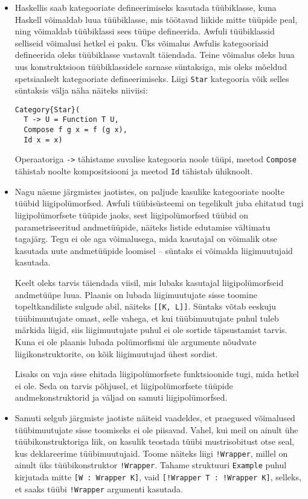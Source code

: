 \documentclass[12pt]{article}
\begin{document}
        \begin{itemize}
          \item
            Haskellis saab kategooriate defineerimiseks kasutada tüübiklasse, kuna Haskell võimaldab luua tüübiklasse, mis töötavad liikide mitte tüüpide peal, ning võimaldab tüübiklassi sees tüüpe defineerida. Awfuli tüübiklassid selliseid võimalusi hetkel ei paku. Üks võimalus Awfulis kategooriaid defineerida oleks tüübiklasse vastavalt täiendada. Teine võimalus oleks luua uus konstruktsioon tüübiklassidele sarnase süntaksiga, mis oleks mõeldud spetsiaalselt kategooriate defineerimiseks. Liigi \verb!Star! kategooria võik selles süntaksis välja näha näiteks niiviisi:

            \begin{verbatim}Category{Star}(
  T -> U = Function T U,
  Compose f g x = f (g x),
  Id x = x)\end{verbatim}

            Operaatoriga \verb!->! tähistame suvalise kategooria noole tüüpi, meetod \verb!Compose! tähistab noolte kompositsiooni ja meetod \verb!Id! tähistab ühiknoolt.
          \item
            Nagu näeme järgmistes jaotistes, on paljude kasulike kategooriate noolte tüübid liigipolümorfsed. Awfuli tüübisüsteemi on tegelikult juba ehitatud tugi liigipolümorfsete tüüpide jaoks, sest liigipolümorfsed tüübid on parametriseeritud andmetüüpide, näiteks listide edutamise vältimatu tagajärg. Tegu ei ole aga võimalusega, mida kasutajal on võimalik otse kasutada uute andmetüüpide loomisel -- süntaks ei võimalda liigimuutujaid kasutada.

            Keelt oleks tarvis täiendada viisil, mis lubaks kasutajal liigipolümorfseid andmetüüpe luua. Plaanis on lubada liigimuutujate sisse toomine topeltkandiliste sulgude abil, näiteks \verb![[K, L]]!. Süntaks võtab eeskuju tüübimuutujate omast, selle vahega, et kui tüübimuutujate puhul tuleb märkida liigid, siis liigimuutujate puhul ei ole sortide täpsustamist tarvis. Kuna ei ole plaanis lubada polümorfismi üle argumente nõudvate liigikonstruktorite, on kõik liigimuutujad ühest sordist.

            Lisaks on vaja sisse ehitada liigipolümorfsete funktsioonide tugi, mida hetkel ei ole. Seda on tarvis põhjusel, et liigipolümorfsete tüüpide andmekonstruktorid ja väljad on samuti liigipolümorfsed.
          \item
            Samuti selgub järgmiste jaotiste näiteid vaadeldes, et praegused võimalused tüübimuutujate sisse toomiseks ei ole piisavad. Vahel, kui meil on ainult ühe tüübikonstruktoriga liik, on kasulik teostada tüübi mustrisobitust otse seal, kus deklareerime tüübimuutujaid. Toome näiteks liigi \verb"!Wrapper", millel on ainult üks tüübikonstruktor \verb"!Wrapper". Tahame struktuuri \verb!Example! puhul kirjutada mitte \verb"[W : Wrapper K]", vaid \verb"[!Wrapper T : !Wrapper K]", selleks, et saaks tüübi \verb"!Wrapper" argumenti kasutada.


\end{itemize}
\end{document}
